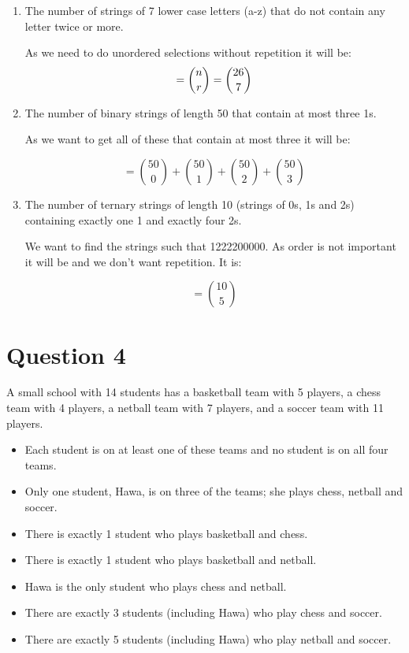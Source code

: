 \documentclass[11pt]{article}
\begin{document}
\begin{enumerate}[label= (\alph*)]
  \item The number of strings of 7 lower case letters (a-z) that do not contain
    any letter twice or more.

    As we need to do unordered selections without repetition it will be:
  \[
    = \binom{n}{r} \\
    = \binom{26}{7}
  \]

  \item The number of binary strings of length 50 that contain at most three 1s.

    As we want to get all of these that contain at most three it will be:

    \[
      =\binom{50}{0} + \binom{50}{1} + \binom{50}{2} + \binom{50}{3}
    \]

  \item The number of ternary strings of length 10 (strings of 0s, 1s and 2s)
    containing exactly one 1 and exactly four 2s.

    We want to find the strings such that 1222200000. As order is not important
    it will be and we don't want repetition. It is:

    \[
      =\binom{10}{5}
    \]

\end{enumerate}

\break{}
\section*{Question 4}

A small school with 14 students has a basketball team with 5 players, a chess
team with 4 players, a netball team with 7 players, and a soccer team with 11
players.

\begin{itemize}
  \item Each student is on at least one of these teams and no student is on all
    four teams.
  \item Only one student, Hawa, is on three of the teams; she plays chess,
    netball and soccer.
  \item There is exactly 1 student who plays basketball and chess.
  \item There is exactly 1 student who plays basketball and netball.
  \item Hawa is the only student who plays chess and netball.
  \item There are exactly 3 students (including Hawa) who play chess and soccer.
  \item There are exactly 5 students (including Hawa) who play netball and
    soccer.
\end{itemize}
\end{document}
